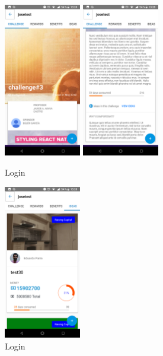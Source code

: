 \begin{figure}[!h]
	\begin{center}
		\includegraphics[width=0.3\textwidth]{./img/anexo1/ver_desafio_inicio.png}
		\includegraphics[width=0.3\textwidth]{./img/anexo1/ver_desafio_inicio_cont.png}
		\caption{Login}
		\label{fig:ver_desafio_inicio}
	\end{center}
\end{figure}

\begin{figure}[!h]
	\begin{center}
		\includegraphics[width=0.3\textwidth]{./img/anexo1/ver_desafio_ideas.png}
		\caption{Login}
		\label{fig:ver_desafio_inicio_ideas}
	\end{center}
\end{figure}

